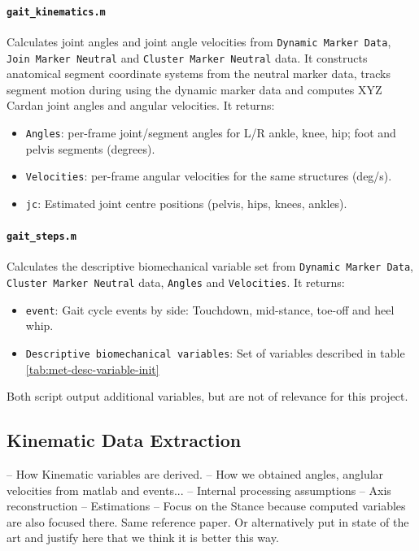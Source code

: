 \paragraph{\texttt{gait\_kinematics.m}} Calculates joint angles and joint angle velocities from \texttt{Dynamic Marker Data}, \texttt{Join Marker Neutral} and \texttt{Cluster Marker Neutral} data. It constructs anatomical segment coordinate systems from the neutral marker data, tracks segment motion during using the dynamic marker data and computes XYZ Cardan joint angles and angular velocities. It returns:
\begin{itemize}
    \item \texttt{Angles}: per-frame joint/segment angles for L/R ankle, knee, hip; foot and pelvis segments (degrees).
    \item \texttt{Velocities}: per-frame angular velocities for the same structures (deg/s).
    \item \texttt{jc}: Estimated joint centre positions (pelvis, hips, knees, ankles).
\end{itemize}

\paragraph{\texttt{gait\_steps.m}} Calculates the descriptive biomechanical variable set from \texttt{Dynamic Marker Data}, \texttt{Cluster Marker Neutral} data, \texttt{Angles} and \texttt{Velocities}. It returns:

\begin{itemize}
    \item \texttt{event}: Gait cycle events by side: Touchdown, mid-stance, toe-off and heel whip.
    \item \texttt{Descriptive biomechanical variables}: Set of variables described in table \ref{tab:met-desc-variable-init}
\end{itemize}

Both script output additional variables, but are not of relevance for this project.

\subsection{Kinematic Data Extraction}\label{subsec:kinematic-data-extraction}
-- How Kinematic variables are derived.
-- How we obtained angles, anglular velocities from matlab and events...
-- Internal processing assumptions
-- Axis reconstruction
-- Estimations
-- Focus on the Stance because computed variables are also focused there. Same reference paper. Or alternatively put in state of the art and justify here that we think it is better this way.

